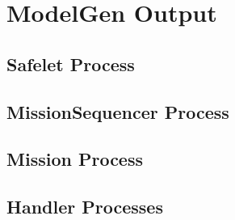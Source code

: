 \documentclass{article}
\begin{document}
\section{ModelGen Output}

\subsection{Safelet Process}

\begin{circusflow}

\end{circusflow}

\begin{circusflow}

\end{circusflow}

\newpage

\subsection{MissionSequencer Process}

\begin{circusflow}

\end{circusflow}

\begin{circusflow}

\end{circusflow}

\newpage

\subsection{Mission Process}

\begin{circusflow}

\end{circusflow}

\begin{circusflow}

\end{circusflow}

\newpage

\subsection{Handler Processes}

\begin{circusflow}

\end{circusflow}
\end{document}
